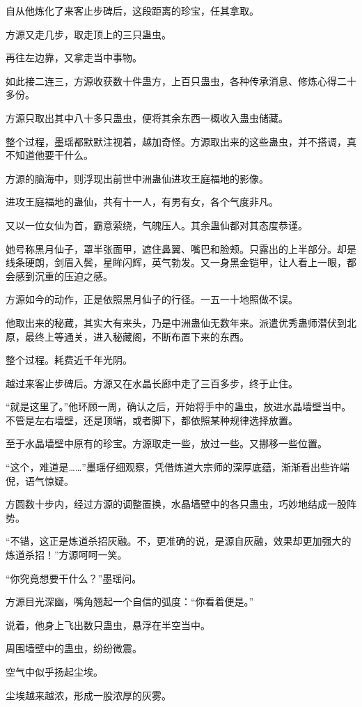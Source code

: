 \begin{this_body}
自从他炼化了来客止步碑后，这段距离的珍宝，任其拿取。

方源又走几步，取走顶上的三只蛊虫。

再往左边靠，又拿走当中事物。

如此接二连三，方源收获数十件蛊方，上百只蛊虫，各种传承消息、修炼心得二十多份。

方源只取出其中八十多只蛊虫，便将其余东西一概收入蛊虫储藏。

整个过程，墨瑶都默默注视着，越加奇怪。方源取出来的这些蛊虫，并不搭调，真不知道他要干什么。

方源的脑海中，则浮现出前世中洲蛊仙进攻王庭福地的影像。

进攻王庭福地的蛊仙，共有十一人，有男有女，各个气度非凡。

又以一位女仙为首，霸意萦绕，气魄压人。其余蛊仙都对其态度恭谨。

她号称黑月仙子，罩半张面甲，遮住鼻翼、嘴巴和脸颊。只露出的上半部分。却是线条硬朗，剑眉入鬓，星眸闪辉，英气勃发。又一身黑金铠甲，让人看上一眼，都会感到沉重的压迫之感。

方源如今的动作，正是依照黑月仙子的行径。一五一十地照做不误。

他取出来的秘藏，其实大有来头，乃是中洲蛊仙无数年来。派遣优秀蛊师潜伏到北原，最终上等通关，进入秘藏阁，不断布置下来的东西。

整个过程。耗费近千年光阴。

越过来客止步碑后。方源又在水晶长廊中走了三百多步，终于止住。

“就是这里了。”他环顾一周，确认之后，开始将手中的蛊虫，放进水晶墙壁当中。不管是左右墙壁，还是顶端，或者脚下，都依照某种规律选择放置。

至于水晶墙壁中原有的珍宝。方源取走一些，放过一些。又挪移一些位置。

“这个，难道是……”墨瑶仔细观察，凭借炼道大宗师的深厚底蕴，渐渐看出些许端倪，语气惊疑。

方圆数十步内，经过方源的调整置换，水晶墙壁中的各只蛊虫，巧妙地结成一股阵势。

“不错，这正是炼道杀招灰融。不，更准确的说，是源自灰融，效果却更加强大的炼道杀招！”方源呵呵一笑。

“你究竟想要干什么？”墨瑶问。

方源目光深幽，嘴角翘起一个自信的弧度：“你看着便是。”

说着，他身上飞出数只蛊虫，悬浮在半空当中。

周围墙壁中的蛊虫，纷纷微震。

空气中似乎扬起尘埃。

尘埃越来越浓，形成一股浓厚的灰雾。


\end{this_body}
